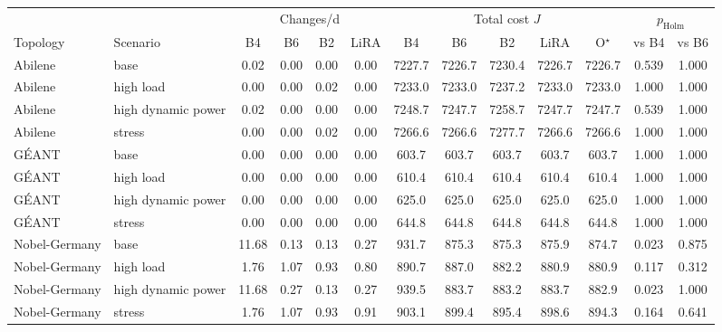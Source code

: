 \begin{tabular}{@{}llccccccccccc@{}}
\toprule
 & & \multicolumn{4}{c}{Changes/d} & \multicolumn{5}{c}{Total cost $J$} & \multicolumn{2}{c}{$p_{\mathrm{Holm}}$} \\
\cmidrule(lr){3-6}\cmidrule(lr){7-11}\cmidrule(lr){12-13}
Topology & Scenario & B4 & B6 & B2 & LiRA & B4 & B6 & B2 & LiRA & O$^\star$ & vs B4 & vs B6 \\
\midrule
Abilene & base & 0.02 & 0.00 & 0.00 & 0.00 & 7227.7 & 7226.7 & 7230.4 & 7226.7 & 7226.7 & 0.539 & 1.000 \\
Abilene & high load & 0.00 & 0.00 & 0.02 & 0.00 & 7233.0 & 7233.0 & 7237.2 & 7233.0 & 7233.0 & 1.000 & 1.000 \\
Abilene & high dynamic power & 0.02 & 0.00 & 0.00 & 0.00 & 7248.7 & 7247.7 & 7258.7 & 7247.7 & 7247.7 & 0.539 & 1.000 \\
Abilene & stress & 0.00 & 0.00 & 0.02 & 0.00 & 7266.6 & 7266.6 & 7277.7 & 7266.6 & 7266.6 & 1.000 & 1.000 \\
\midrule
G\'{E}ANT & base & 0.00 & 0.00 & 0.00 & 0.00 & 603.7 & 603.7 & 603.7 & 603.7 & 603.7 & 1.000 & 1.000 \\
G\'{E}ANT & high load & 0.00 & 0.00 & 0.00 & 0.00 & 610.4 & 610.4 & 610.4 & 610.4 & 610.4 & 1.000 & 1.000 \\
G\'{E}ANT & high dynamic power & 0.00 & 0.00 & 0.00 & 0.00 & 625.0 & 625.0 & 625.0 & 625.0 & 625.0 & 1.000 & 1.000 \\
G\'{E}ANT & stress & 0.00 & 0.00 & 0.00 & 0.00 & 644.8 & 644.8 & 644.8 & 644.8 & 644.8 & 1.000 & 1.000 \\
\midrule
Nobel-Germany & base & 11.68 & 0.13 & 0.13 & 0.27 & 931.7 & 875.3 & 875.3 & 875.9 & 874.7 & 0.023 & 0.875 \\
Nobel-Germany & high load & 1.76 & 1.07 & 0.93 & 0.80 & 890.7 & 887.0 & 882.2 & 880.9 & 880.9 & 0.117 & 0.312 \\
Nobel-Germany & high dynamic power & 11.68 & 0.27 & 0.13 & 0.27 & 939.5 & 883.7 & 883.2 & 883.7 & 882.9 & 0.023 & 1.000 \\
Nobel-Germany & stress & 1.76 & 1.07 & 0.93 & 0.91 & 903.1 & 899.4 & 895.4 & 898.6 & 894.3 & 0.164 & 0.641 \\

\bottomrule
\end{tabular}
